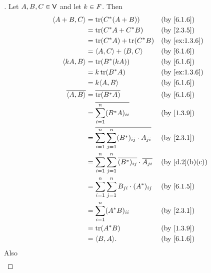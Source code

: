 \begin{proof}[]
  Let \(A, B, C \in \mathsf{V}\) and let \(k \in \mathit{F}\).
  Then
  \begin{align*}
    \inn{A + B, C}    & = \tr(C^* (A + B))                                                      &  & \by{6.1.6}    \\
                      & = \tr(C^* A + C^* B)                                                    &  & \by{2.3.5}    \\
                      & = \tr(C^* A) + \tr(C^* B)                                               &  & \by{ex:1.3.6} \\
                      & = \inn{A, C} + \inn{B, C}                                               &  & \by{6.1.6}    \\
    \inn{kA, B}       & = \tr(B^* (kA))                                                         &  & \by{6.1.6}    \\
                      & = k \tr(B^* A)                                                          &  & \by{ex:1.3.6} \\
                      & = k \inn{A, B}                                                          &  & \by{6.1.6}    \\
    \conj{\inn{A, B}} & = \conj{\tr(B^* A)}                                                     &  & \by{6.1.6}    \\
                      & = \conj{\sum_{i = 1}^n (B^* A)_{i i}}                                   &  & \by{1.3.9}    \\
                      & = \conj{\sum_{i = 1}^n \sum_{j = 1}^n (B^*)_{i j} \cdot A_{j i}}        &  & \by{2.3.1}    \\
                      & = \sum_{i = 1}^n \sum_{j = 1}^n \conj{(B^*)_{i j}} \cdot \conj{A_{j i}} &  & \by{d.2}[b,c] \\
                      & = \sum_{i = 1}^n \sum_{j = 1}^n B_{j i} \cdot (A^*)_{i j}               &  & \by{6.1.5}    \\
                      & = \sum_{i = 1}^n (A^* B)_{i i}                                          &  & \by{2.3.1}    \\
                      & = \tr(A^* B)                                                            &  & \by{1.3.9}    \\
                      & = \inn{B, A}.                                                           &  & \by{6.1.6}
  \end{align*}
  Also
  \begin{align*}

\end{align*}
\end{proof}
